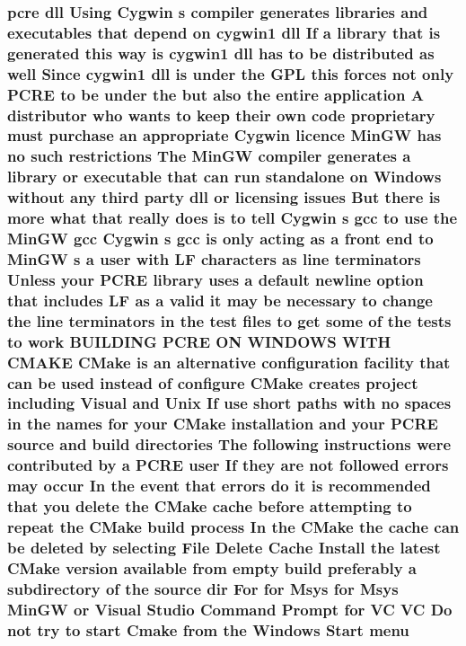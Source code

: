 \subsubsection[{\texorpdfstring{menu}{menu}}]{ {\bf pcre} dll Using Cygwin {\bf s} {\bf compiler} generates {\bf libraries} and executables that depend {\bf on} cygwin1 dll If {\bf a} {\bf library} that {\bf is} {\bf generated} {\bf this} {\bf way} {\bf is} cygwin1 dll has {\bf to} {\bf be} {\bf distributed} {\bf as} well Since cygwin1 dll {\bf is} under the {\bf G\+PL} {\bf this} forces {\bf not} only {\bf P\+C\+RE} {\bf to} {\bf be} under the but also the entire application {\bf A} distributor who wants {\bf to} keep their own {\bf code} proprietary must purchase an appropriate Cygwin {\bf licence} {\bf Min\+GW} has no such restrictions The {\bf Min\+GW} {\bf compiler} generates {\bf a} {\bf library} {\bf or} executable that {\bf can} {\bf run} standalone {\bf on} {\bf Windows} without {\bf any} third party dll {\bf or} licensing issues But there {\bf is} more {\bf what} that really does {\bf is} {\bf to} tell Cygwin {\bf s} {\bf gcc} {\bf to} use the {\bf Min\+GW} {\bf gcc} Cygwin {\bf s} {\bf gcc} {\bf is} only acting {\bf as} {\bf a} front {\bf end} {\bf to} {\bf Min\+GW} {\bf s} {\bf a} user {\bf with} {\bf LF} {\bf characters} {\bf as} {\bf line} terminators Unless your {\bf P\+C\+RE} {\bf library} uses {\bf a} {\bf default} {\bf newline} {\bf option} that includes {\bf LF} {\bf as} {\bf a} valid {\bf it} may {\bf be} necessary {\bf to} change the {\bf line} terminators {\bf in} the test {\bf files} {\bf to} get some {\bf of} the {\bf tests} {\bf to} work B\+U\+I\+L\+D\+I\+NG {\bf P\+C\+RE} ON W\+I\+N\+D\+O\+WS W\+I\+TH C\+M\+A\+KE C\+Make {\bf is} an alternative configuration {\bf facility} that {\bf can} {\bf be} {\bf used} instead {\bf of} {\bf configure} C\+Make creates {\bf project} including Visual and Unix If use short paths {\bf with} no spaces {\bf in} the {\bf names} for your C\+Make installation and your {\bf P\+C\+RE} {\bf source} and build {\bf directories} The following {\bf instructions} were contributed by {\bf a} {\bf P\+C\+RE} user If they {\bf are} {\bf not} followed {\bf errors} may {\bf occur} In the event that {\bf errors} {\bf do} {\bf it} {\bf is} recommended that you delete the C\+Make {\bf cache} before attempting {\bf to} repeat the C\+Make build {\bf process} In the C\+Make the {\bf cache} {\bf can} {\bf be} deleted by selecting File Delete Cache Install the latest C\+Make version {\bf available} {\bf from} {\bf empty} build preferably {\bf a} subdirectory {\bf of} the {\bf source} {\bf dir} For for {\bf Msys} for {\bf Msys} {\bf Min\+GW} {\bf or} Visual {\bf Studio} Command Prompt for VC VC Do {\bf not} try {\bf to} {\bf start} Cmake {\bf from} the {\bf Windows} Start menu}\hypertarget{NON-AUTOTOOLS-BUILD_8txt_a164f496f9d8e7ec1eab8d56a626ad2bc}{}\label{NON-AUTOTOOLS-BUILD_8txt_a164f496f9d8e7ec1eab8d56a626ad2bc}

